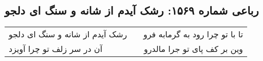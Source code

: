 \begin{center}
\section*{رباعی شماره ۱۵۶۹: رشک آیدم از شانه و سنگ ای دلجو}
\label{sec:1569}
\begin{longtable}{l p{0.5cm} r}
رشک آیدم از شانه و سنگ ای دلجو
&&
تا با تو چرا رود به گرمابه فرو
\\
آن در سر زلف تو چرا آویزد
&&
وین بر کف پای تو جرا مالدرو
\\
\end{longtable}
\end{center}
